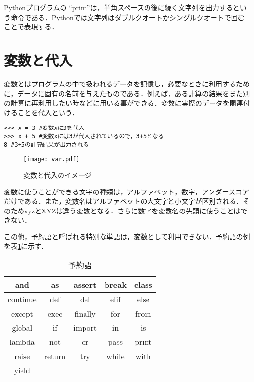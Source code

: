 Pythonプログラムの ``print''は，半角スペースの後に続く文字列を出力するという命令である．Pythonでは文字列はダブルクオートかシングルクオートで囲むことで表現する．


\section{変数と代入}
変数とはプログラムの中で扱われるデータを記憶し，必要なときに利用するために，データに固有の名前を与えたものである．例えば，ある計算の結果をまた別の計算に再利用したい時などに用いる事ができる．変数に実際のデータを関連付けることを代入という．


\begin{lstlisting}[caption=変数と代入,label=var&assign]
>>> x = 3 #変数xに3を代入
>>> x + 5 #変数xには3が代入されているので，3+5となる
8 #3+5の計算結果が出力される
\end{lstlisting}


\begin{figure}[htbp]
\begin{center}
\texttt{[image: var.pdf]}
\caption{変数と代入のイメージ}
\label{fig:fig1}
\end{center}
\end{figure}


変数に使うことができる文字の種類は，アルファベット，数字，アンダースコアだけである．また，変数名はアルファベットの大文字と小文字が区別される．そのためxyzとXYZは違う変数となる．さらに数字を変数名の先頭に使うことはできない．


この他，予約語と呼ばれる特別な単語は，変数として利用できない．予約語の例を表\ref{tab:tab1}に示す．


\begin{table}[h]
  \begin{center}
  \caption{予約語}
  \begin{tabular}{|c|c|c|c|c|} \hline
  and & as & assert & break & class \\ \hline
  continue & def & del & elif & else \\ \hline
  except & exec & finally & for & from \\ \hline
  global & if & import & in & is \\ \hline
  lambda & not & or & pass & print \\ \hline
  raise & return & try & while & with \\ \hline
  yield & & & & \\ \hline
  \end{tabular}
  \label{tab:tab1}
  \end{center}
\end{table}


